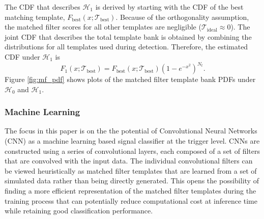The CDF that describes $\mathcal{H}_1$ is derived by starting with the CDF of the best matching template, $F_\mathrm{best}(x;\mathcal{T}_\mathrm{best})$. Because of the orthogonality assumption, the matched filter scores for all other templates are negligible ($\mathcal{T}_\mathrm{ideal}\approx0$). The joint CDF that describes the total template bank is obtained by combining the distributions for all templates used during detection. %
Therefore, the estimated CDF under $\mathcal{H}_1$ is
\begin{equation}
    F_{1}(x;\mathcal{T}_\mathrm{best})=F_\mathrm{best}(x;\mathcal{T}_\mathrm{best})\left(1-e^{-x^2}\right)^{N_t}.
\end{equation}
Figure \ref{fig:mf_pdf} shows plots of the matched filter template bank  PDFs under $\mathcal{H}_0$ and $\mathcal{H}_1$.

\subsubsection{Machine Learning}
The focus in this paper is on the the potential of Convolutional Neural Networks (CNN) as a machine learning based signal classifier at the trigger level. CNNs are constructed using a series of convolutional layers, each composed of a set of filters that are convolved with the input data. The individual convolutional filters can be viewed heuristically as matched filter templates \cite{cnn_are_mf} that are learned from a set of simulated data rather than being directly generated. This opens the possibility of finding a more efficient representation of the matched filter templates during the training process that can potentially reduce computational cost at inference time while retaining good classification performance. 

